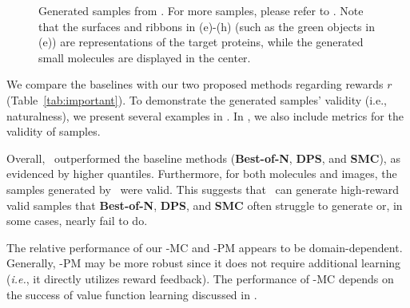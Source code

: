{\begin{figure}[!th]
{    \label{fig:vina4_grid}}
    \setlength{\belowcaptionskip}{-6pt}
\caption{Generated samples from \alg. For more samples, please refer to . Note that the surfaces and ribbons in (e)-(h) (such as the green objects in (e)) are representations of the target proteins, while the generated small molecules are displayed in the center.
}
\vspace{-2mm}
    \label{fig:compare_images}
\end{figure}

We compare the baselines with our two proposed methods regarding rewards $r$ (Table~\ref{tab:important}). To demonstrate the generated samples' validity (i.e., naturalness), we present several examples in . In , we also include metrics for the validity of samples. 



Overall, \alg\ outperformed the baseline methods (\textbf{Best-of-N}, \textbf{DPS}, and \textbf{SMC}), as evidenced by higher quantiles. Furthermore, for both molecules and images, the samples generated by \alg\ were valid. This suggests that \alg\ can generate high-reward valid samples that \textbf{Best-of-N}, \textbf{DPS}, and \textbf{SMC} often struggle to generate or, in some cases, nearly fail to do.

The relative performance of our \alg-MC and \alg-PM appears to be domain-dependent. Generally, \alg-PM may be more robust since it does not require additional learning (\textit{i.e.}, it directly utilizes reward feedback). The performance of \alg-MC depends on the success of value function learning discussed in . 

}
